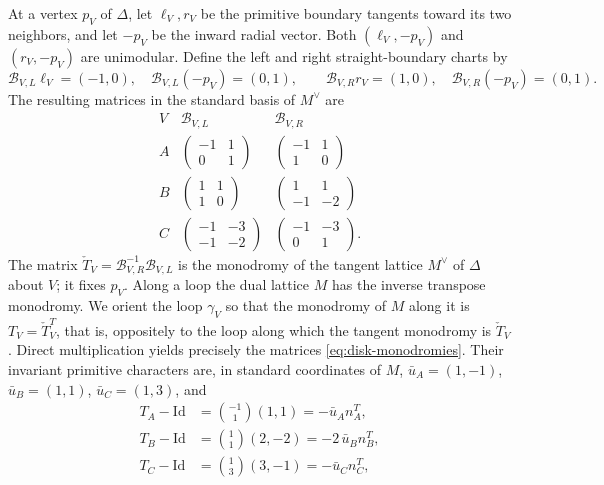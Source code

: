 At a vertex $p_V$ of $\Delta$, let $\ell_V,r_V$ be the primitive boundary
tangents toward its two neighbors, and let $-p_V$ be the inward radial
vector.  Both $(\ell_V,-p_V)$ and $(r_V,-p_V)$ are unimodular.  Define the
left and right straight-boundary charts by
\[
 \mathcal B_{V,L}\ell_V=(-1,0),\quad \mathcal B_{V,L}(-p_V)=(0,1),
 \qquad
 \mathcal B_{V,R}r_V=(1,0),\quad \mathcal B_{V,R}(-p_V)=(0,1).
\]
The resulting matrices in the standard basis of $M^\vee$ are
\begin{equation}\label{eq:straight-boundary-frames}
\begin{array}{c|c|c}
 V&\mathcal B_{V,L}&\mathcal B_{V,R}\\ \hline
 A&\begin{pmatrix}-1&1\\0&1\end{pmatrix}
  &\begin{pmatrix}-1&1\\1&0\end{pmatrix}\\[5pt]
 B&\begin{pmatrix}1&1\\1&0\end{pmatrix}
  &\begin{pmatrix}1&1\\-1&-2\end{pmatrix}\\[5pt]
 C&\begin{pmatrix}-1&-3\\-1&-2\end{pmatrix}
  &\begin{pmatrix}-1&-3\\0&1\end{pmatrix}.
\end{array}
\end{equation}
The matrix $\check T_V=\mathcal B_{V,R}^{-1}\mathcal B_{V,L}$ is the monodromy of the tangent
lattice $M^\vee$ of $\Delta$ about $V$; it fixes $p_V$.  Along a
loop the dual lattice $M$ has the inverse transpose monodromy.  We orient
the loop $\gamma_V$ so that the monodromy of $M$ along it is
$T_V=\check T_V^T$, that is, oppositely to the loop along which the tangent
monodromy is $\check T_V$.  Direct multiplication yields precisely the
matrices \eqref{eq:disk-monodromies}.  Their invariant primitive characters
are, in standard coordinates of $M$, $\bar u_A=(1,-1)$, $\bar u_B=(1,1)$,
$\bar u_C=(1,3)$, and
\begin{equation}\label{eq:disk-rank-one}
\begin{aligned}
 T_A-\mathrm{Id}&=\binom{-1}{1}(1,1)=-\bar u_An_A^T,\\
 T_B-\mathrm{Id}&=\binom11(2,-2)=-2\,\bar u_Bn_B^T,\\
 T_C-\mathrm{Id}&=\binom13(3,-1)=-\bar u_Cn_C^T,
\end{aligned}
\end{equation}
